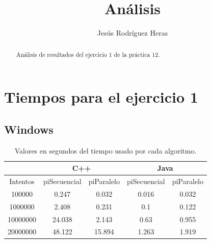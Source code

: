 \documentclass[12pt,letterpaper]{article}
\title{Análisis}
\author{Jesús Rodríguez Heras}
\begin{document}
	
	\maketitle
	\begin{abstract} %
		\begin{center}
			Análisis de resultados del ejercicio 1 de la práctica 12.
		\end{center}
	\end{abstract}
	\thispagestyle{empty}
	\newpage
	
	
	
	
	
	\lstset{language=bash, numbers=left, numberstyle=\tiny, numbersep=10pt, firstnumber=1, stepnumber=1, basicstyle=\small\ttfamily, tabsize=1, extendedchars=true, inputencoding=latin1}

\section{Tiempos para el ejercicio 1}
\subsection{Windows}
\begin{center}
	\begin{table}[htbp]
		\begin{center}
			\begin{tabular}{|c|c|c|c|c|}
				\hline
				& \multicolumn{2}{c|}{C++} & \multicolumn{2}{c|}{Java}  \\
				\hline
				Intentos  & piSecuencial & piParalelo & piSecuencial & piParalelo \\\hline
				100000 & 0.247 & 0.032 & 0.016 & 0.032 \\\hline
				1000000 & 2.408 & 0.231 & 0.1 & 0.122 \\\hline
				10000000 & 24.038 & 2.143 & 0.63 & 0.955 \\\hline
				20000000 & 48.122 & 15.894 & 1.263 & 1.919 \\\hline
			\end{tabular}
			\caption{Valores en segundos del tiempo usado por cada algoritmo.}
			\label{tabla:Valores en segundos del tiempo usado por cada algoritmo}
		\end{center}
	\end{table}
\end{center}
\end{document}
